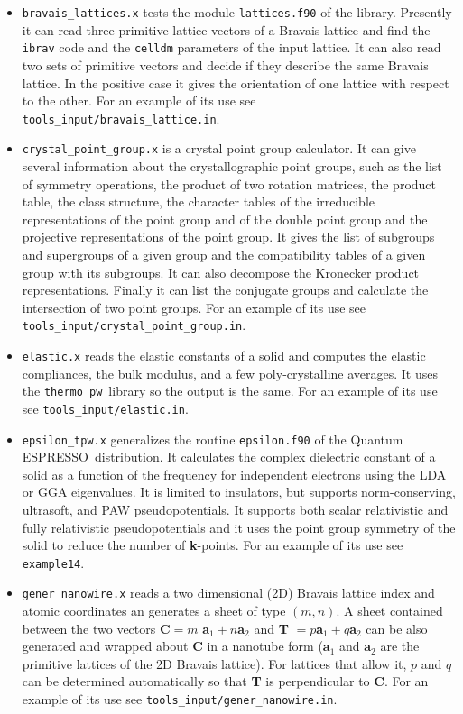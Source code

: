 \documentclass[12pt,a4paper]{article}
\def\qe{{\sc Quantum ESPRESSO}}
\def\thermo{\texttt{thermo\_pw}}
\begin{document}
\begin{itemize}

\item \texttt{bravais\_lattices.x} tests the
module \texttt{lattices.f90} of the library. Presently it can read three
primitive lattice vectors of a Bravais lattice and find the \texttt{ibrav}
code and the \texttt{celldm} parameters of the input lattice. It
can also read two sets of primitive vectors and decide if they describe
the same Bravais lattice. In the positive case it gives the orientation
of one lattice with respect to the other.
For an example of its use see \texttt{tools\_input/bravais\_lattice.in}.

\item \texttt{crystal\_point\_group.x} is a crystal point group calculator.
It can give several information about the crystallographic point groups,
such as the list of symmetry operations, the product of two rotation
matrices, the product table, the class structure, the character tables of 
the irreducible representations of the point group and of the double
point group and the projective representations of the point group. It
gives the list of subgroups and supergroups of a given group and 
the compatibility tables of a given group with its subgroups. It can 
also decompose the Kronecker product representations. Finally it
can list the conjugate groups and calculate the intersection of two
point groups.
For an example of its use see \texttt{tools\_input/crystal\_point\_group.in}.

\item \texttt{elastic.x} reads the elastic constants of a
solid and computes the elastic compliances, the bulk modulus, and a few
poly-crystalline averages. It uses the \thermo\ library so the output is the
same. 
For an example of its use see \texttt{tools\_input/elastic.in}.

\item \texttt{epsilon\_tpw.x} generalizes the routine
\texttt{epsilon.f90} of the \qe\ distribution. It calculates the 
complex dielectric
constant of a solid as a function of the frequency for independent electrons
using the LDA or GGA eigenvalues. It is limited to insulators, but supports
norm-conserving, ultrasoft, and PAW pseudopotentials. It supports both scalar
relativistic and fully relativistic pseudopotentials and it uses the point
group symmetry of the solid to reduce the number of {\bf k}-points.
For an example of its use see \texttt{example14}.

\item \texttt{gener\_nanowire.x} reads a two dimensional (2D)
Bravais lattice index and atomic coordinates an generates a sheet of type
$(m,n)$. A sheet contained between the two vectors 
{\bf C}$ = m$ {\bf a}$_1 + n ${\bf a}$_2$ and {\bf T} $= p ${\bf a}$_1 + q ${\bf a}$_2$
can be also generated and wrapped about {\bf C} in a nanotube form 
({\bf a}$_1$ and {\bf a}$_2$ are the primitive lattices of the 2D Bravais 
lattice). 
For lattices that allow it, $p$ and $q$ can be determined automatically so that 
{\bf T} is perpendicular to {\bf C}.
For an example of its use see \texttt{tools\_input/gener\_nanowire.in}.


\end{itemize}
\end{document}
